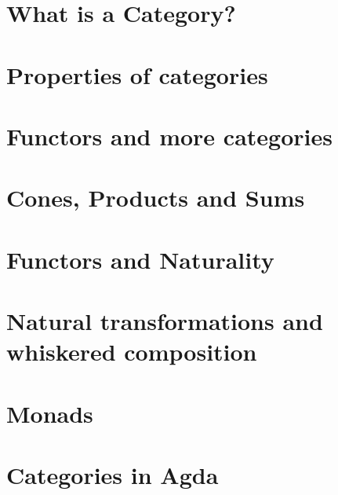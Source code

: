\documentclass[11pt,twoside]{report}
\theoremstyle{definition}
\begin{document}
\chapter{What is a Category?}


\chapter{Properties of categories}


\chapter{Functors and more categories}


\chapter{Cones, Products and Sums}


\chapter{Functors and Naturality}


\chapter{Natural transformations and whiskered composition}


\chapter{Monads}


\chapter{Categories in Agda}

\end{document}
